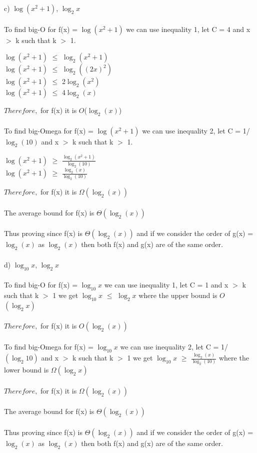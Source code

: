 \documentclass{article}
\begin{document}
c) $\log(x^2 + 1 )$, $\log_{2}{x}$ \\ \\ 
To find big-O for f(x) =  $\log(x^2 + 1)$ we can use inequality 1, let C = 4 and x $>$ k such that k $>$ 1.
\begin{center}
$\log(x^2 + 1 )$ $\leq$ $\log_{2}{(x^2 + 1)}$ \\
$\log(x^2 + 1 )$ $\leq$ $\log_{2}{((2x)^2)}$ \\
$\log(x^2 + 1 )$ $\leq$ 2$\log_{2}{(x^2)}$ \\
$\log(x^2 + 1 )$ $\leq$ 4$\log_{2}{(x)}$ \\
\end{center}
$Therefore,$ for f(x) it is $O$($\log_{2}{(x)}$) \\ \\ 
To find big-Omega for f(x) =  $\log(x^2 + 1)$ we can use inequality 2, let C = 1/$\log_{2}{(10)}$ and x $>$ k such that k $>$ 1. 
\begin{center}
$\log(x^2 + 1 )$ $\geq$ $\frac {\log_{2}{(x^2+1)}}{\log_{2}{(10)}}$ \\
$\log(x^2 + 1 )$ $\geq$ $\frac {\log_{2}{(x)}}{\log_{2}{(10)}}$  \\
\end{center}
$Therefore,$ for f(x) it is $\Omega(\log_{2}{(x)})$ \\ \\ 
The average bound for f(x) is $\Theta(\log_{2}{(x)})$ \\ \\ 
Thus proving since f(x) is $\Theta(\log_{2}{(x)})$ and if we consider the order of g(x) = $\log_{2}{(x)}$ as $\log_{2}{(x)}$ then both f(x) and g(x) are of the same order. \\ \\
d) $\log_{10}{x}$, $\log_{2}{x}$ \\ \\ 
To find big-O for f(x) =  $\log_{10}{x}$ we can use inequality 1, let C = 1 and x $>$ k such that k $>$ 1 we get $\log_{10}{x} $ $\leq$ $\log_{2}{x}$ where the upper bound is $O$ $(\log_{2}{x})$ \\\\
$Therefore,$ for f(x) it is $O(\log_{2}{(x)})$ \\ \\ 
To find big-Omega for f(x) =  $\log_{10}{x}$ we can use inequality 2, let C = 1/$(\log_{2}{10})$ and x $>$ k such that k $>$ 1 we get $\log_{10}{x} $ $\geq$ $\frac {\log_{2}{(x)}}{\log_{2}{(10)}}$ where the lower bound is $\Omega$$(\log_{2}{x})$ \\\\
$Therefore,$ for f(x) it is $\Omega(\log_{2}{(x)})$ \\ \\ 
The average bound for f(x) is $\Theta(\log_{2}{(x)})$ \\ \\ 
Thus proving since f(x) is $\Theta(\log_{2}{(x)})$ and if we consider the order of g(x) = $\log_{2}{(x)}$ as $\log_{2}{(x)}$ then both f(x) and g(x) are of the same order.
\newpage 
\end{document}
